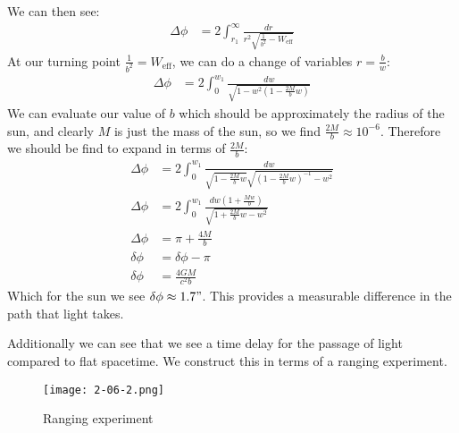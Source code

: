 We can then see:
\begin{align*}
	\Delta \phi &= 2\int_{r_1}^\infty \frac{dr}{r^2\sqrt{\frac{1}{b^2} - W_\text{eff}}}
\end{align*}
At our turning point $\frac{1}{b^2} = W_\text{eff}$, we can do a change of variables $r= \frac{b}{w}$:
\begin{align*}
	\Delta \phi &= 2\int_{0}^{w_1} \frac{dw}{\sqrt{1 - w^2\left(1- \frac{2M}{b}w\right)}}
\end{align*}
We can evaluate our value of $b$ which should be approximately the radius of the sun, and clearly $M$ is just the mass of the sun, so we find $\frac{2M}{b} \approx 10^{-6}$.
Therefore we should be find to expand in terms of $\frac{2M}{b}$:
\begin{align*}
	\Delta \phi &= 2\int_{0}^{w_1} \frac{dw}{\sqrt{1- \frac{2M}{b}w}\sqrt{\left(1- \frac{2M}{b}w\right)^{-1} - w^2}} \\
	\Delta \phi &= 2\int_{0}^{w_1} \frac{dw(1+ \frac{Mw}{b})}{\sqrt{1+ \frac{2M}{b}w - w^2}} \\
	\Delta \phi &= \pi + \frac{4M}{b} \\
	\delta\phi &= \delta\phi - \pi \\
	\delta\phi &= \frac{4GM}{c^2b}
\end{align*}
Which for the sun we see $\delta\phi \approx 1.7"$. This provides a measurable difference in the path that light takes.

Additionally we can see that we see a time delay for the passage of light compared to flat spacetime. 
We construct this in terms of a ranging experiment.
\begin{figure*}[h]
	\centering
	\texttt{[image: 2-06-2.png]}
	\caption*{Ranging experiment}
\end{figure*}

